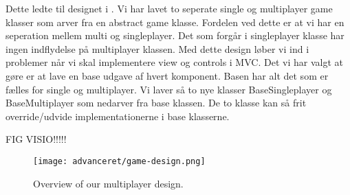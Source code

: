Dette ledte til designet i  . Vi har lavet to seperate single og multiplayer game klasser som arver fra en abstract game klasse. Fordelen ved dette er at vi har en seperation mellem multi og singleplayer. Det som forgår i singleplayer klasse har ingen indflydelse på multiplayer klassen. Med dette design løber vi ind i problemer når vi skal implementere view og controls i MVC. Det vi har valgt at gøre er at lave en base udgave af hvert komponent. Basen har alt det som er fælles for single og multiplayer. Vi laver så to nye klasser BaseSingleplayer og BaseMultiplayer som nedarver fra base klassen.  De to klasse kan så frit override/udvide implementationerne i base klasserne. 

FIG VISIO!!!!!


\begin{figure}[h]
	\centering
	\graphicspath{ {pics/} }
   \texttt{[image: advanceret/game-design.png]}
	\hspace{0.1\textwidth}
	\caption{Overview of our multiplayer design.}
\end{figure}

